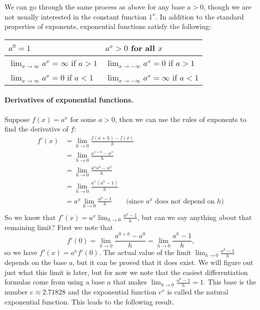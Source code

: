\documentclass[12pt]{report}
\begin{document}
We can go through the same process as above for any base $a>0$, though we are not usually interested in the constant function $1^x$. In addition to the standard properties of exponents, exponential functions satisfy the following:

\begin{center}
\begin{tabular}{| l | l |}
\hline
$ a^0=1$ & $a^x>0$ for all $x$\\
\hline
$\displaystyle\lim_{x\to\infty}a^x=\infty$ if $a>1$ & $\displaystyle\lim_{x\to-\infty}a^x=0$ if $a>1$\\
\hline
$\displaystyle\lim_{x\to\infty}a^x=0$ if $a<1$ & $\displaystyle\lim_{x\to-\infty}a^x=\infty$ if $a<1$\\
\hline
\end{tabular}
\end{center}

\paragraph{Derivatives of exponential functions.} Suppose $f(x)=a^x$ for some $a>0$, then we can use the rules of exponents to find the derivative of $f$:
\begin{equation*}
\begin{split}
f'(x)&=\lim_{h\to 0}\frac{f(x+h)-f(x)}{h}\\
&=\lim_{h\to 0}\frac{a^{x+h}-a^x}{h}\\
&=\lim_{h\to 0}\frac{a^xa^h-a^x}{h}\\
&=\lim_{h\to 0}\frac{a^x(a^h-1)}{h}\\
&=a^x\lim_{h\to 0}\frac{a^h-1}{h} \qquad\text{(since $a^x$ does not depend on $h$)}\\
\end{split}
\end{equation*}
So we know that $f'(x)=\displaystyle a^x \lim_{h\to 0}\frac{a^h-1}{h}$, but can we say anything about that remaining limit? First we note that \[f'(0)=\lim_{h\to 0}\frac  {a^{0+h}-a^0}{h}=\lim_{h\to 0}\frac{a^h-1}{h}\text{,}\] so we have $f'(x)=a^xf'(0)$. The actual value of the limit $\displaystyle \lim_{h\to 0}\frac{a^h-1}{h}$ depends on the base $a$, but it can be proved that it does exist. We will figure out just what this limit is later, but for now we note that the easiest differentiation formulas come from using a base $a$ that makes $\displaystyle \lim_{h\to 0}\frac{a^h-1}{h}=1$. This base is the number $e\approx 2.71828$ and the exponential function $e^x$ is called the natural exponential function. This leads to the following result.
\end{document}
